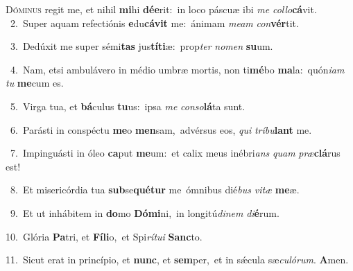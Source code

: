 \lettrine{\initial\textcolor{\initialcolor}{D}}{óminus} regit me, et nihil \textbf{mi}\-hi \textbf{dé}\-\textbf{e}rit:~\star in loco páscuæ ibi \textit{me} \textit{col}\-\textit{lo}\textbf{cá}vit.\\
{\numbfont\textcolor{\numbcolor}{~2.}}~Super aquam refectiónis \textbf{e}\-du\-\textbf{cá}\-\textbf{vit} me:~\star ánimam \textit{me}\-\textit{am} \textit{con}\-\textbf{vér}tit.\par
{\numbfont\textcolor{\numbcolor}{~3.}}~Dedúxit me super sémi\textbf{tas} jus\-\textbf{tí}\-\textbf{ti}æ:~\star prop\textit{ter} \textit{no}\-\textit{men} \textbf{su}\-um.\par
{\numbfont\textcolor{\numbcolor}{~4.}}~Nam, etsi ambulávero in médio umbræ mortis, non ti\-\textbf{mé}\-bo \textbf{ma}\-la:~\star quón\-\textit{i}\-\textit{am} \textit{tu} \textbf{me}\-cum es.\par
{\numbfont\textcolor{\numbcolor}{~5.}}~Virga tua, et \textbf{bá}\-culus \textbf{tu}\-us:~\star ipsa \textit{me} \textit{con}\-\textit{so}\textbf{lá}ta sunt.\par
{\numbfont\textcolor{\numbcolor}{~6.}}~Parásti in conspéctu \textbf{me}\-o \textbf{men}\-sam,~\star advérsus eos, \textit{qui} \textit{trí}\-\textit{bu}\textbf{lant} me.\par
{\numbfont\textcolor{\numbcolor}{~7.}}~Impinguásti in óleo \textbf{ca}\-put \textbf{me}\-um:~\star et calix meus inébri\textit{ans} \textit{quam} \textit{præ}\-\textbf{clá}rus est!\par
{\numbfont\textcolor{\numbcolor}{~8.}}~Et misericórdia tua \textbf{sub}\-se\-\textbf{qué}\-\textbf{tur} me~\star ómnibus dié\textit{bus} \textit{vi}\-\textit{tæ} \textbf{me}\-æ.\par
{\numbfont\textcolor{\numbcolor}{~9.}}~Et ut inhábitem in \textbf{do}\-mo \textbf{Dó}\-\textbf{mi}ni,~\star in longitú\-\textit{di}\-\textit{nem} \textit{di}\-\textbf{é}rum.\par
{\numbfont\textcolor{\numbcolor}{10.}}~Glória \textbf{Pa}\-tri, et \textbf{Fí}\-\textbf{li}o,~\star et Spi\-\textit{rí}\-\textit{tu}\textit{i} \textbf{Sanc}\-to.\par
{\numbfont\textcolor{\numbcolor}{11.}}~Sicut erat in princípio, et \textbf{nunc}\-, et \textbf{sem}\-per,~\star et in sǽcula sæ\-\textit{cu}\-\textit{ló}\textit{rum}. \textbf{A}\-men.\par
